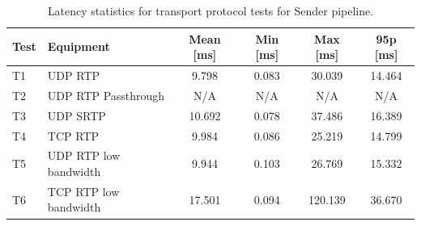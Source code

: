 \begin{table}[H]
    \centering
    \caption{Latency statistics for transport protocol tests for Sender pipeline.}\label{tab:send_transport_latency}
    \begin{tabular}{|l|l|c|c|c|c|}
    \hline
    \textbf{Test} & \textbf{Equipment} & \textbf{Mean [ms]} & \textbf{Min [ms]} & \textbf{Max [ms]} & \textbf{95p [ms]} \\
    \hline
    T1 & UDP RTP & 9.798 & 0.083 & 30.039 & 14.464\\
    \hline
    T2 & UDP RTP Passthrough & N/A & N/A & N/A & N/A  \\
    \hline
    T3 & UDP SRTP & 10.692 & 0.078 & 37.486 & 16.389 \\
    \hline
    T4 & TCP RTP & 9.984 & 0.086 & 25.219 & 14.799  \\
    \hline
    T5 & UDP RTP low bandwidth & 9.944 & 0.103 & 26.769 & 15.332\\
    \hline
    T6 & TCP RTP low bandwidth & 17.501 & 0.094 & 120.139 & 36.670 \\
    \hline
    \end{tabular}
\end{table}
